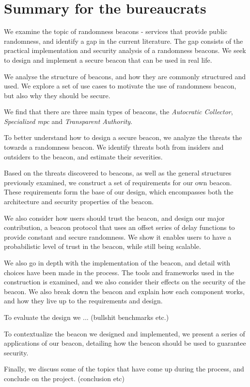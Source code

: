 \section{Summary for the bureaucrats}
We examine the topic of randomness beacons - services that provide public randomness, and identify a gap in the current literature. The gap consists of the practical implementation and security analysis of a randomness beacons. We seek to design and implement a secure beacon that can be used in real life.

We analyse the structure of beacons, and how they are commonly structured and used. We explore a set of use cases to motivate the use of randomness beacon, but also why they should be secure.

We find that there are three main types of beacons, the \emph{Autocratic Collector}, \emph{Specialized \acrshort{mpc}} and \emph{Transparent Authority}.

To better understand how to design a secure beacon, we analyze the threats the towards a randomness beacon. We identify threats both from insiders and outsiders to the beacon, and estimate their severities.

Based on the threats discovered to beacons, as well as the general structures previously examined, we construct a set of requirements for our own beacon. These requirements form the base of our design, which encompasses both the architecture and security properties of the beacon.

We also consider how users should trust the beacon, and design our major contribution, a beacon protocol that uses an offset series of delay functions to provide constant and secure randomness. We show it enables users to have a probabilistic level of trust in the beacon, while still being scalable.

We also go in depth with the implementation of the beacon, and detail with choices have been made in the process. The tools and frameworks used in the construction is examined, and we also consider their effects on the security of the beacon. We also break down the beacon and explain how each component works, and how they live up to the requirements and design.

To evaluate the design we ... (bullshit benchmarks etc.)

To contextualize the beacon we designed and implemented, we present a series of applications of our beacon, detailing how the beacon should be used to guarantee security.

Finally, we discuss some of the topics that have come up during the process, and conclude on the project. (conclusion etc)